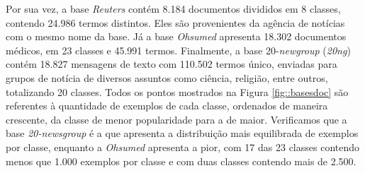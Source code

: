 Por sua vez, a base \textit{Reuters} contém 8.184 documentos divididos em 8 classes, contendo 24.986 termos distintos. Eles são provenientes da agência de notícias com o mesmo nome da base. 
Já a base \textit{Ohsumed} apresenta 18.302 documentos médicos, em 23 classes e 45.991 termos.
Finalmente, a base 20-\textit{newgroup} (\textit{20ng}) contém 18.827 mensagens de texto com 110.502 termos único, enviadas para grupos de notícia de diversos assuntos como ciência, religião, entre outros, totalizando 20 classes.
Todos os pontos mostrados na Figura \ref{fig::basesdoc} são referentes à quantidade de exemplos de cada classe, ordenados de maneira crescente, da classe de menor popularidade para a de maior. Verificamos que a base \textit{20-newsgroup} é a que apresenta a distribuição mais equilibrada de exemplos por classe, enquanto a \textit{Ohsumed} apresenta a pior, com 17 das 23 classes contendo menos que 1.000 exemplos por classe e com duas classes contendo mais de 2.500.

